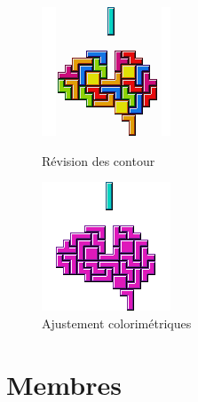 \documentclass{report}
\begin{document}
\begin{figure}[h!]
	\begin{minipage}{.5\textwidth}
		\centering
		\includegraphics[width=0.75\linewidth]{Team_logo_007.png}
		\caption{R\'{e}vision des contour}
		\label{fig:sub2}
	\end{minipage}
	\begin{minipage}{.5\textwidth}
		\centering
		\includegraphics[width=0.75\linewidth]{Team_logo_008.png}
		\caption{Ajustement colorim\'{e}triques}
		\label{fig:sub2}
	\end{minipage}
\end{figure}

\newpage
			\section{Membres}
\end{document}
